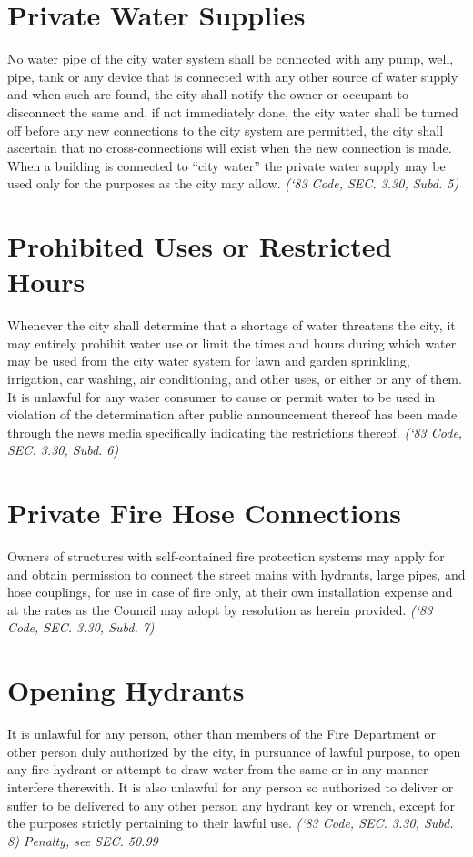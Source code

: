 \documentclass[code.tex]{subfiles}
\begin{document}
\section{Private Water Supplies}
No water pipe of the city water system shall be connected with any pump, well, pipe, tank or any device that is connected with any other source of water supply and when such are found, the city shall notify the owner or occupant to disconnect the same and, if not immediately done, the city water shall be turned off before any new connections to the city system are permitted, the city shall ascertain that no cross-connections will exist when the new connection is made. When a building is connected to “city water” the private water supply may be used only for the purposes as the city may allow.\newline
\emph{(‘83 Code, SEC. 3.30, Subd. 5)}
\section{Prohibited Uses or Restricted Hours}
Whenever the city shall determine that a shortage of water threatens the city, it may entirely prohibit water use or limit the times and hours during which water may be used from the city water system for lawn and garden sprinkling, irrigation, car washing, air conditioning, and other uses, or either or any of them.  It is unlawful for any water consumer to cause or permit water to be used in violation of the determination after public announcement thereof has been made through the news media specifically indicating the restrictions thereof.\newline
\emph{(‘83 Code, SEC. 3.30, Subd. 6)}
\section{Private Fire Hose Connections}
Owners of structures with self-contained fire protection systems may apply for and obtain permission to connect the street mains with hydrants, large pipes, and hose couplings, for use in case of fire only, at their own installation expense and at the rates as the Council may adopt by resolution as herein provided.\newline
\emph{(‘83 Code, SEC. 3.30, Subd. 7)}
\section{Opening Hydrants}
It is unlawful for any person, other than members of the Fire Department or other person duly authorized by the city, in pursuance of lawful purpose, to open any fire hydrant or attempt to draw water from the same or in any manner interfere therewith.  It is also unlawful for any person so authorized to deliver or suffer to be delivered to any other person any hydrant key or wrench, except for the purposes strictly pertaining to their lawful use.\newline
\emph{(‘83 Code, SEC. 3.30, Subd. 8)  Penalty, see SEC. 50.99}
\end{document}
